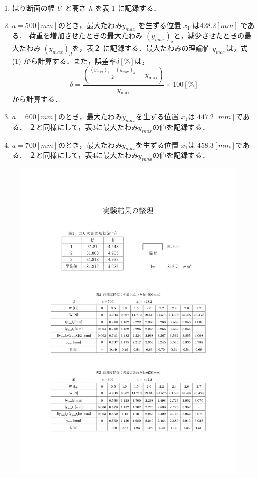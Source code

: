 \documentclass[a4paper,11pt]{jsarticle}
\begin{document}
\begin{enumerate}
  \item はり断面の幅 $b'$ と高さ $h$ を表 1 に記録する．
  \item $a = 500 [mm] $のとき，最大たわみ$y_{max}$ を生ずる位置 $x_1$ は$ 428.2 [mm]$ である．
  荷重を増加させたときの最大たわみ $(y_{max})_i$と，減少させたときの最大たわみ $(y_{max})_d$を，表２
  に記録する．最大たわみの理論値 $y_{max}$は，式 (1) から計算する．また，誤差率$ \delta [\%]$は，
  \begin{equation} 
    \delta = \frac{{\left(\frac{{(y_{\text{max}})_i + (y_{\text{max}})_d}}{2} - y_{\text{max}}\right)}}{{y_{\text{max}}}} \times 100[\%]
  \end{equation}
  から計算する．
  \item $a = 600 [mm] $のとき，最大たわみ$ y_{max}$を生ずる位置 $x_1$は $447.2 [mm] $である．
  ２と同様にして，表3に最大たわみ$y_{max}$の値を記録する．
  \item $a = 700 [mm] $のとき，最大たわみ$ y_{max}$を生ずる位置 $x_1$は $458.3 [mm] $である．
  ２と同様にして，表4に最大たわみ$y_{max}$の値を記録する．
\end{enumerate}

\begin{figure}[htbp]
  \centering
  \includegraphics[page=1,width=\textwidth,height=\textheight]{1.pdf}
\end{figure}
\end{document}
